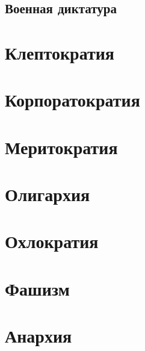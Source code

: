 \documentclass[a4paper,12pt,titlepage]{report}
\begin{document}
\subsection*{Военная диктатура}

\section*{Клептократия}
\section*{Корпоратократия}
\section*{Меритократия}
\section*{Олигархия}
\section*{Охлократия}
\section*{Фашизм}
\section*{Анархия}

\begin{thebibliography}{9}
\end{thebibliography}
\end{document}
